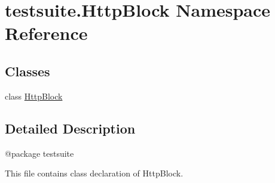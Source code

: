 \hypertarget{namespacetestsuite_1_1HttpBlock}{}\section{testsuite.\+Http\+Block Namespace Reference}
\label{namespacetestsuite_1_1HttpBlock}
\subsection*{Classes}
\begin{DoxyCompactItemize}
\item 
class \hyperlink{classtestsuite_1_1HttpBlock_1_1HttpBlock}{Http\+Block}
\end{DoxyCompactItemize}


\subsection{Detailed Description}
\begin{DoxyVerb}@package testsuite

This file contains class declaration of HttpBlock.
\end{DoxyVerb}
 